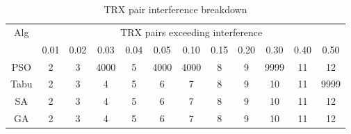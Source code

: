 \begin{table}[H]
\centering
	\begin{tabular}{cccccccccccc}
	\toprule
    Alg & \multicolumn{11}{c}{TRX pairs exceeding interference}\\
    & 0.01 & 0.02 & 0.03 & 0.04 & 0.05 & 0.10 & 0.15 & 0.20 & 0.30 & 0.40 & 0.50 \\
    \midrule
    PSO & 2 & 3 & \tiny{4000} & 5 & \small{4000} & \footnotesize{4000} & 8 & 9 & \scriptsize{9999} & 11 & 12\\
    Tabu & 2 & 3 & 4 & 5 & 6 & 7 & 8 & 9 & 10 & 11 & 9999\\
    SA & 2 & 3 & 4 & 5 & 6 & 7 & 8 & 9 & 10 & 11 & 12\\
    GA & 2 & 3 & 4 & 5 & 6 & 7 & 8 & 9 & 10 & 11 & 12\\
    \bottomrule
	\end{tabular}
\caption{TRX pair interference breakdown}
\label{tab:breakdown-siem2m1}
\end{table}

